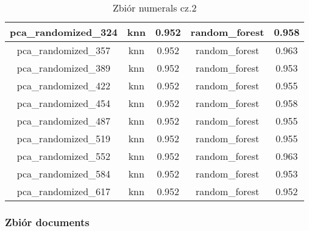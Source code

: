 \documentclass{classrep}
\begin{document}
{{{\begin{table}[!htbp]
\begin{tabular}{|c|c|c|c|c|}
                        pca\_randomized\_324 & knn & 0.952 & random\_forest & 0.958 \\ \hline
                        pca\_randomized\_357 & knn & 0.952 & random\_forest & 0.963 \\ \hline
                        pca\_randomized\_389 & knn & 0.952 & random\_forest & 0.953 \\ \hline
                        pca\_randomized\_422 & knn & 0.952 & random\_forest & 0.955 \\ \hline
                        pca\_randomized\_454 & knn & 0.952 & random\_forest & 0.958 \\ \hline
                        pca\_randomized\_487 & knn & 0.952 & random\_forest & 0.955 \\ \hline
                        pca\_randomized\_519 & knn & 0.952 & random\_forest & 0.955 \\ \hline
                        pca\_randomized\_552 & knn & 0.952 & random\_forest & 0.963 \\ \hline
                        pca\_randomized\_584 & knn & 0.952 & random\_forest & 0.953 \\ \hline
                        pca\_randomized\_617 & knn & 0.952 & random\_forest & 0.952 \\ \hline
                    \end{tabular}
                    \caption
                    {Zbiór numerals cz.2}
                    \label{table_principal_component_analysis_numerals_2}
                \end{table}
                \FloatBarrier

            }

            \subsubsection{Zbiór documents} {

}}}
\end{document}
